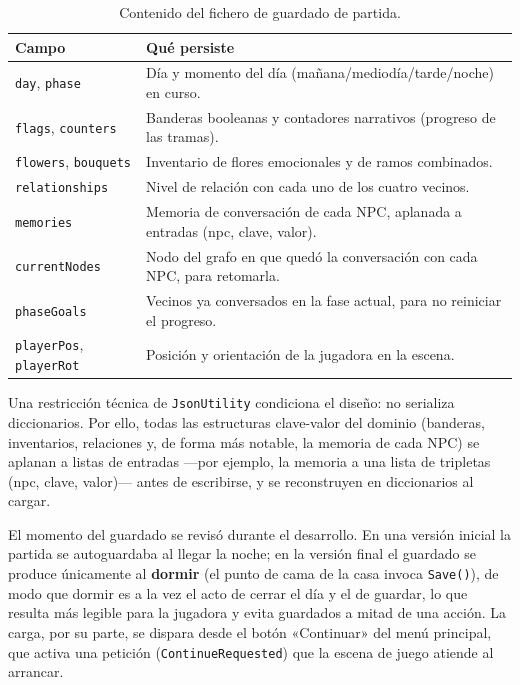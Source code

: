 \documentclass[12pt,twoside,titlepage]{report}
\begin{document}
\begin{table}[h]
  \centering
  \caption{Contenido del fichero de guardado de partida.}
  \label{tab:guardado}
  \begin{footnotesize}
  \renewcommand{\arraystretch}{1.3}
  \begin{tabular}{p{4cm}p{9cm}}
    \hline
    \textbf{Campo} & \textbf{Qué persiste} \\
    \hline
    \texttt{day}, \texttt{phase} & Día y momento del día (mañana/mediodía/tarde/noche) en curso. \\
    \hline
    \texttt{flags}, \texttt{counters} & Banderas booleanas y contadores narrativos (progreso de las tramas). \\
    \hline
    \texttt{flowers}, \texttt{bouquets} & Inventario de flores emocionales y de ramos combinados. \\
    \hline
    \texttt{relationships} & Nivel de relación con cada uno de los cuatro vecinos. \\
    \hline
    \texttt{memories} & Memoria de conversación de cada NPC, aplanada a entradas (npc, clave, valor). \\
    \hline
    \texttt{currentNodes} & Nodo del grafo en que quedó la conversación con cada NPC, para retomarla. \\
    \hline
    \texttt{phaseGoals} & Vecinos ya conversados en la fase actual, para no reiniciar el progreso. \\
    \hline
    \texttt{playerPos}, \texttt{playerRot} & Posición y orientación de la jugadora en la escena. \\
    \hline
  \end{tabular}
  \end{footnotesize}
\end{table}

Una restricción técnica de \texttt{JsonUtility} condiciona el diseño: no serializa diccionarios. Por ello, todas las estructuras clave-valor del dominio (banderas, inventarios, relaciones y, de forma más notable, la memoria de cada NPC) se aplanan a listas de entradas ---por ejemplo, la memoria a una lista de tripletas (npc, clave, valor)--- antes de escribirse, y se reconstruyen en diccionarios al cargar.

El momento del guardado se revisó durante el desarrollo. En una versión inicial la partida se autoguardaba al llegar la noche; en la versión final el guardado se produce únicamente al \textbf{dormir} (el punto de cama de la casa invoca \texttt{Save()}), de modo que dormir es a la vez el acto de cerrar el día y el de guardar, lo que resulta más legible para la jugadora y evita guardados a mitad de una acción. La carga, por su parte, se dispara desde el botón «Continuar» del menú principal, que activa una petición (\texttt{ContinueRequested}) que la escena de juego atiende al arrancar.
\end{document}
